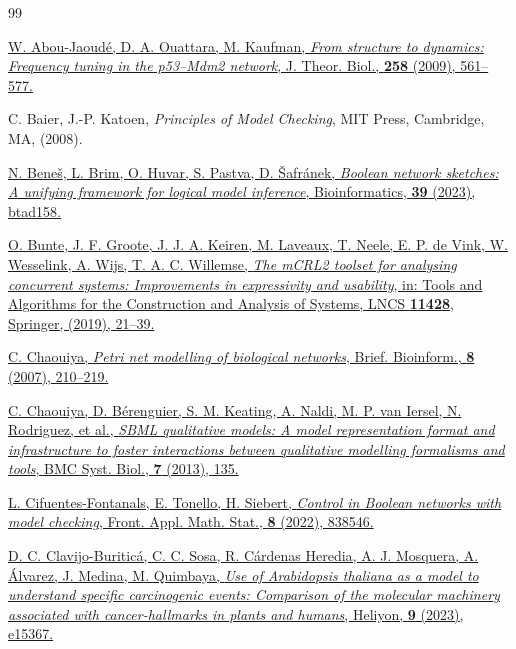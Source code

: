 \begin{thebibliography}{99}

\href{https://doi.org/10.1016/j.jtbi.2009.02.005}
{W. Abou-Jaoud\'e, D. A. Ouattara, M. Kaufman,
\textit{From structure to dynamics: Frequency tuning in the p53--Mdm2 network},
J. Theor. Biol., {\bf 258} (2009), 561--577.}

C. Baier, J.-P. Katoen, \textit{Principles of Model Checking}, MIT Press,
Cambridge, MA, (2008).

\href{https://doi.org/10.1093/bioinformatics/btad158}
{N. Bene{\v{s}}, L. Brim, O. Huvar, S. Pastva, D. {\v{S}}afr\'anek,
\textit{Boolean network sketches: A unifying framework for logical model
inference}, Bioinformatics, {\bf 39} (2023), btad158.}

\href{https://doi.org/10.1007/978-3-030-17465-1_2}
{O. Bunte, J. F. Groote, J. J. A. Keiren, M. Laveaux, T. Neele, E. P. de Vink,
W. Wesselink, A. Wijs, T. A. C. Willemse, \textit{The mCRL2 toolset for
analysing concurrent systems: Improvements in expressivity and usability}, in:
Tools and Algorithms for the Construction and Analysis of Systems, LNCS
{\bf 11428}, Springer, (2019), 21--39.}

\href{https://doi.org/10.1093/bib/bbm029}
{C. Chaouiya, \textit{Petri net modelling of biological networks}, Brief.
Bioinform., {\bf 8} (2007), 210--219.}

\href{https://doi.org/10.1186/1752-0509-7-135}
{C. Chaouiya, D. B\'erenguier, S. M. Keating, A. Naldi, M. P. van Iersel,
N. Rodriguez, et al., \textit{SBML qualitative models: A model representation
format and infrastructure to foster interactions between qualitative modelling
formalisms and tools}, BMC Syst. Biol., {\bf 7} (2013), 135.}

\href{https://doi.org/10.3389/fams.2022.838546}
{L. Cifuentes-Fontanals, E. Tonello, H. Siebert, \textit{Control in Boolean
networks with model checking}, Front. Appl. Math. Stat., {\bf 8} (2022), 838546.}

\href{https://doi.org/10.1016/j.heliyon.2023.e15367}
{D. C. Clavijo-Buritic\'a, C. C. Sosa, R. C\'ardenas Heredia, A. J. Mosquera,
A. \'Alvarez, J. Medina, M. Quimbaya, \textit{Use of Arabidopsis thaliana as a
model to understand specific carcinogenic events: Comparison of the molecular
machinery associated with cancer-hallmarks in plants and humans}, Heliyon,
{\bf 9} (2023), e15367.}


\end{thebibliography}
